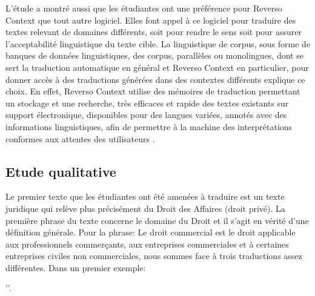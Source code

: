 \documentclass{textolivre}
\begin{document}
 L’étude a montré aussi que les étudiantes ont une préférence pour Reverso Context que tout autre logiciel. Elles font appel à ce logiciel pour traduire des textes relevant de domaines différents, soit pour rendre le sens soit pour assurer l’acceptabilité linguistique du texte cible. La linguistique de corpus, sous forme de banques de données linguistiques, des corpus, parallèles ou monolingues, dont se sert la traduction automatique en général et Reverso Context en particulier, pour donner accès à des traductions générées dans des contextes différents \cite{loock2016} explique ce choix. En effet, Reverso Context utilise des mémoires de traduction permettant un stockage et une recherche, très efficaces et rapide des textes existants sur support électronique, disponibles pour des langues variées, annotés avec des informations linguistiques, afin de permettre à la machine des interprétations conformes aux attentes des utilisateurs \cite{kehu2020}.
 
 \subsection{Etude qualitative}\label{sec-qualitative}
 
 Le premier texte que les étudiantes ont été amenées à traduire est un texte juridique qui relève plus précisément du Droit des Affaires (droit privé). La première phrase du texte concerne le domaine du Droit et il s’agit en vérité d’une définition générale. Pour la phrase: Le droit commercial est le droit applicable aux professionnels commerçants, aux entreprises commerciales et à certaines entreprises civiles non commerciales, nous sommes face à trois traductions assez différentes. Dans un premier exemple:
  
''.
\end{document}
